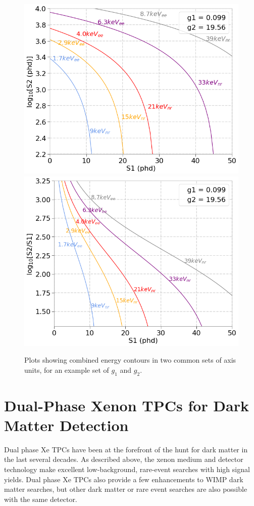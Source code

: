 \begin{figure}[htbp]
\begin{center}
\includegraphics[width=\halffig]{figures/lxetpcs/E_contours.png}
\includegraphics[width=\halffig]{figures/lxetpcs/E_contours2.png}
\caption{Plots showing combined energy contours in two common sets of axis units, for an example set of $g_{1}$ and $g_{2}$.}
\label{fig:e_contours}
\end{center}
\end{figure}



\section{Dual-Phase Xenon TPCs for Dark Matter Detection}
Dual phase Xe \ac{TPC}s have been at the forefront of the hunt for dark matter in the last several decades. As described above, the xenon medium and detector technology make excellent low-background, rare-event searches with high signal yields. Dual phase Xe \ac{TPC}s also provide a few enhancements to WIMP dark matter searches, but other dark matter or rare event searches are also possible with the same detector.


